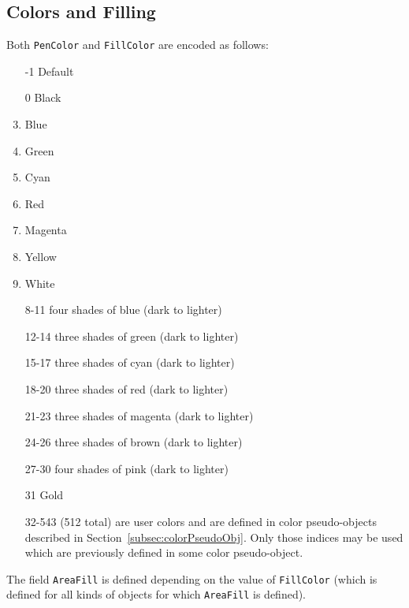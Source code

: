 \documentclass[10pt, a4paper]{article}
\begin{document}
\subsection{Colors and Filling}\label{subsec:paramColorsFill}

\noindent
Both {\tt PenColor} and {\tt FillColor} are encoded as follows: 
%
\begin{enumerate}
\item[-1]    Default
\item[0]     Black
\item        Blue
\item        Green
\item        Cyan
\item        Red
\item        Magenta
\item        Yellow
\item        White
\item[8-11]  four shades of blue (dark to lighter)
\item[12-14] three shades of green (dark to lighter)
\item[15-17] three shades of cyan (dark to lighter)
\item[18-20] three shades of red (dark to lighter)
\item[21-23] three shades of magenta (dark to lighter)
\item[24-26] three shades of brown (dark to lighter)
\item[27-30] four shades of pink (dark to lighter)
\item[31]    Gold
\item[32-543] (512 total) are user colors and
              are defined in color pseudo-objects 
              described in Section~\ref{subsec:colorPseudoObj}. 
              Only those indices may be used 
              which are previously defined in some color pseudo-object. 
\end{enumerate}

The field {\tt AreaFill} is defined depending on the value of {\tt FillColor} 
(which is defined for all kinds of objects 
for which {\tt AreaFill} is defined). 
\end{document}
